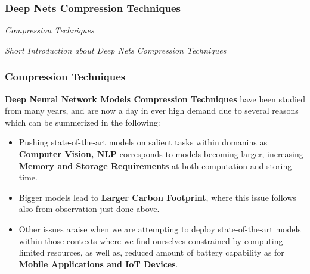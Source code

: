 



\begin{frame}
    \frametitle{Deep Nets Compression Techniques}
        \begin{center}
            {\fontsize{40}{50}\selectfont \emph{Compression Techniques}}
        \end{center}
        \begin{center}
            \emph{Short Introduction about Deep Nets Compression Techniques}
        \end{center}
\end{frame}

\begin{frame}

    \frametitle{Compression Techniques}

    \textbf{Deep Neural Network Models Compression Techniques} have been studied from many years, and are now a day in ever high demand due to several reasons
        which can be summerized in the following:

        \begin{itemize}

            \item Pushing state-of-the-art models on salient tasks within domanins as \textbf{Computer Vision, NLP} corresponds to models becoming larger,
                increasing \textbf{Memory and Storage Requirements} at both computation and storing time.

            \item Bigger models lead to \textbf{Larger Carbon Footprint}, where this issue follows also from observation just done above.

            \item Other issues araise when we are attempting to deploy state-of-the-art models within those contexts where we find ourselves
                constrained by computing limited resources, as well as, reduced amount of battery capability
                as for \textbf{Mobile Applications and IoT Devices}.

    \end{itemize}

\end{frame}
